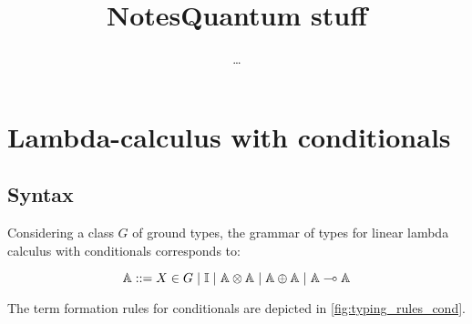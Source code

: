 \documentclass[10pt,a4paper]{amsart}
\author{\dots}
\title{Notes}
\theoremstyle{definition}
\theoremstyle{definition}
\theoremstyle{definition}
\theoremstyle{definition}
\theoremstyle{definition}
\theoremstyle{definition}
\begin{document}
\title{Quantum stuff}
\maketitle
\section{Lambda-calculus with conditionals}

\subsection{Syntax}

Considering a class $G$ of ground types, the grammar of types for linear lambda calculus with conditionals corresponds to:

\begin{equation*} \label{eq:grammartypes}
  \centering
   \mathbb{A} ::= X \in G \hspace{3 pt} \vert \hspace{3 pt} \mathbb{I}  \hspace{3 pt}  \vert \hspace{3 pt} \mathbb{A}  \otimes  \mathbb{A} \hspace{3 pt} \vert  \hspace{3 pt} \mathbb{A}  \oplus \mathbb{A} \hspace{3 pt}  \vert  \hspace{3 pt} \mathbb{A} \multimap  \mathbb{A}
  \end{equation*}

The term formation rules for conditionals are depicted in \autoref{fig:typing_rules_cond}. 
\end{document}
